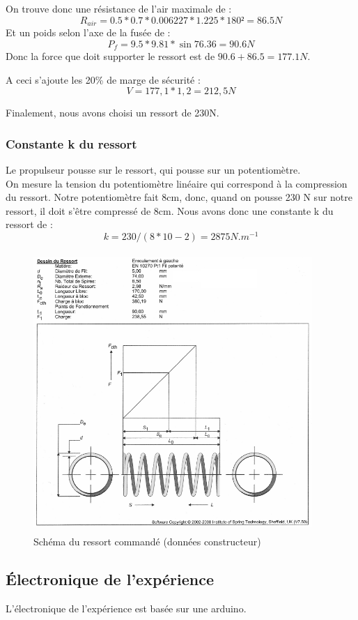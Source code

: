 \documentclass[a4paper,12pt]{scrartcl}
\begin{document}
	      On trouve donc une résistance de l’air maximale de :
	      $$R_{air} = 0.5*0.7*0.006227*1.225*180² = 86.5 N$$
	      Et un poids selon l’axe de la fusée de : 
	      $$P_f = 9.5*9.81*\sin{76.36} = 90.6 N$$
	      Donc la force que doit supporter le ressort est de $90.6+86.5 = 177.1 N$.

	      A ceci s'ajoute les 20\% de marge de sécurité : 
	      $$V = 177,1 * 1,2 = 212,5 N$$

	      Finalement, nous avons choisi un ressort de 230N.
	      \subsubsection{Constante k du ressort}
	      Le propulseur pousse sur le ressort, qui pousse sur un potentiomètre.\\
	      On mesure la tension du potentiomètre linéaire qui correspond à la compression du ressort.
	      Notre potentiomètre fait 8cm, donc, quand on pousse 230 N sur notre ressort, il doit s’être compressé de 8cm.
	      Nous avons donc une constante k du ressort de : 
	      $$k = 230/(8*10-2) = 2875 N.m^{-1}$$
		\begin{figure}[H]
		    \begin{center}
		      \caption{Schéma du ressort commandé (données constructeur) }
		      \includegraphics[height=400px, width=400px]{Photos_Mercury/ressort.png}
		    \end{center}
		\end{figure}
 

	\subsection{Électronique de l'expérience}
		L'électronique de l'expérience est basée sur une arduino.\\
\end{document}
